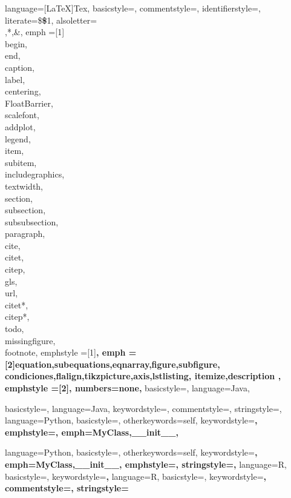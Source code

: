 	{
	language=[LaTeX]{Tex},
    basicstyle=\scriptsize,
    commentstyle=\color{dkgreen},
    identifierstyle=\color{black},
    literate={\$}{{{\bfseries\color{Dandelion}\$}}}1, %
    alsoletter={\\,*,\&},
    emph =[1]{\\begin,\\end,\\caption,\\label,\\centering,\\FloatBarrier,
              \,\\scalefont,\\addplot,\,
              \\legend,\\item,\\subitem,\\includegraphics,\\textwidth,
              \\section,\\subsection,\\subsubsection,\\paragraph,
              \\cite,\\citet,\\citep,\\gls,\,\\url,
              \\citet*,\\citep*,\\todo,\\missingfigure,\\footnote},
  	emphstyle =[1]\bfseries\color{RoyalBlue},
  	emph = [2]{equation,subequations,eqnarray,figure,subfigure,
  			   condiciones,flalign,tikzpicture,axis,lstlisting,
  			   itemize,description
  			   },
  	emphstyle =[2]\bfseries,
    numbers=none,
	}
{
	basicstyle=\scriptsize,
	language=Java,
}

{
	basicstyle=\scriptsize,
	language=Java,
  	keywordstyle=\color{blue},
  	commentstyle=\color{dkgreen},
  	stringstyle=\color{mauve},
}
{
	language=Python,
	basicstyle=\scriptsize,
	otherkeywords={self},  
	keywordstyle=\bfseries,     
	emphstyle=\bfseries,    
	emph={MyClass,__init__},         
}

{
	language=Python,
	basicstyle=\scriptsize,
	otherkeywords={self},          
	keywordstyle=\bfseries\color{deepblue},
	emph={MyClass,__init__},         
	emphstyle=\bfseries\color{deepred},    
	stringstyle=\color{deepgreen},
}
{
	language=R,                     
  	basicstyle=\scriptsize,
  	keywordstyle=\bfseries, 
}
{
	language=R,                     
  	basicstyle=\scriptsize,
  	keywordstyle=\bfseries\color{RoyalBlue}, 
  	commentstyle=\color{YellowGreen},
  	stringstyle=\color{ForestGreen}  
}
